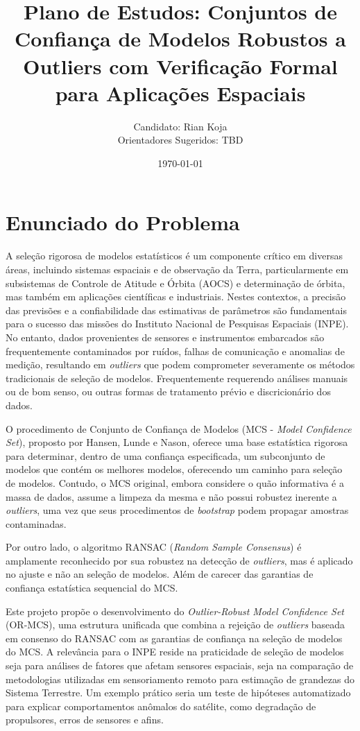 \documentclass[12pt,a4paper]{article}
\title{Plano de Estudos: Conjuntos de Confiança de Modelos Robustos a Outliers com Verificação Formal para Aplicações Espaciais}
\author{Candidato: Rian Koja \\ Orientadores Sugeridos: TBD} %
\date{\today}
\newcommand{\outliers}{\textit{outliers}}
\begin{document}
\maketitle

\section{Enunciado do Problema}

A seleção rigorosa de modelos estatísticos é um componente crítico em diversas áreas, incluindo sistemas espaciais e de observação da Terra, particularmente em subsistemas de Controle de Atitude e Órbita (AOCS) e determinação de órbita, mas também em aplicações científicas e industriais. Nestes contextos, a precisão das previsões e a confiabilidade das estimativas de parâmetros são fundamentais para o sucesso das missões do Instituto Nacional de Pesquisas Espaciais (INPE). No entanto, dados provenientes de sensores e instrumentos embarcados são frequentemente contaminados por ruídos, falhas de comunicação e anomalias de medição, resultando em \outliers{} que podem comprometer severamente os métodos tradicionais de seleção de modelos. Frequentemente requerendo análises manuais ou de bom senso, ou outras formas de tratamento prévio e discricionário dos dados.

O procedimento de Conjunto de Confiança de Modelos (MCS - \textit{Model Confidence Set}), proposto por Hansen, Lunde e Nason, oferece uma base estatística rigorosa para determinar, dentro de uma confiança especificada, um subconjunto de modelos que contém os melhores modelos, oferecendo um caminho para seleção de modelos. Contudo, o MCS original, embora considere o quão informativa é a massa de dados, assume a limpeza da mesma e não possui robustez inerente a \outliers{}, uma vez que seus procedimentos de \textit{bootstrap} podem propagar amostras contaminadas.

Por outro lado, o algoritmo RANSAC (\textit{Random Sample Consensus}) é amplamente reconhecido por sua robustez na detecção de \outliers{}, mas é aplicado no ajuste e não an seleção de modelos. Além de carecer das garantias de confiança estatística sequencial do MCS.

Este projeto propõe o desenvolvimento do \textit{Outlier-Robust Model Confidence Set} (OR-MCS), uma estrutura unificada que combina a rejeição de \outliers{} baseada em consenso do RANSAC com as garantias de confiança na seleção de modelos do MCS. A relevância para o INPE reside na praticidade de seleção de modelos seja para análises de fatores que afetam sensores espaciais, seja na comparação de metodologias utilizadas em sensoriamento remoto para estimação de grandezas do Sistema Terrestre. Um exemplo prático seria um teste de hipóteses automatizado para explicar comportamentos anômalos do satélite, como degradação de propulsores, erros de sensores e afins.
\end{document}
